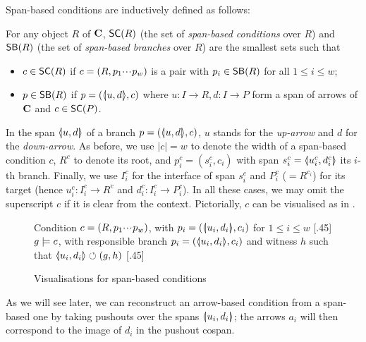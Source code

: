 
\medskip\noindent
Span-based conditions are inductively defined as follows:

\begin{definition}
  For any object $R$ of $\mathbf{C}$, $\SC R$ (the set of \emph{span-based conditions} over $R$) and $\SB R$ (the set of \emph{span-based branches} over $R$) are the smallest sets such that
  \begin{itemize}
  \item $c\in \SC R$ if $c=(R,p_1{\cdotp\mkern-2mu\cdotp\mkern-2mu\cdotp\mkern1mu} p_w)$ is a pair with $p_i\in \SB R$ for all $1\leq i\leq w$;
  \item $p\in \SB R$ if $p=(\spanof u d,c)$ where $u: I\to R, d:I\to P$ form a span of arrows of $\mathbf{C}$ and $c\in \SC P$.
  \end{itemize}
\end{definition}
%
In the span $\spanof u d$ of a branch $p=(\spanof u d,c)$, $u$ stands for the \emph{up-arrow} and $d$ for the \emph{down-arrow}. As before, we use $|c|=w$ to denote the width of a span-based condition $c$, $R^c$ to denote its root, and $p^c_i=(s^c_i,c_i)$ with span $s^c_i=\spanof{u^c_i}{d^c_i}$ its $i$-th branch. Finally, we use $I^c_i$ for the interface of span $s^c_i$ and $P^c_i$ ($=R^{c_i}$) for its target (hence $u^c_i:I^c_i\to R^c$ and $d^c_i:I^c_i\rightarrow P^c_i$). In all these cases, we may omit the superscript $c$ if it is clear from the context. Pictorially, $c$ can be visualised as in .
%
\begin{figure}[t]
\centering
\subcaptionbox
  {Condition $c=(R,p_1{\cdotp\mkern-2mu\cdotp\mkern-2mu\cdotp\mkern1mu} p_w)$, with $p_i=(\spanof{u_i}{d_i},c_i)$ for $1\leq i\leq w$
   }
  [.45\textwidth]
  {}
\qquad
\subcaptionbox
  {$g\models c$, with responsible branch $p_i=(\spanof{u_i}{d_i},c_i)$ and witness $h$ such that $\spanof{u_i}{d_i}\commutes (g,h)$
   }
  [.45\textwidth]
  {}
\caption{Visualisations for span-based conditions}
\end{figure}
%
As we will see later, we can reconstruct an arrow-based condition from a span-based one by taking pushouts over the spans $\spanof{u_i}{d_i}$; the arrows $a_i$ will then correspond to the image of $d_i$ in the pushout cospan.

